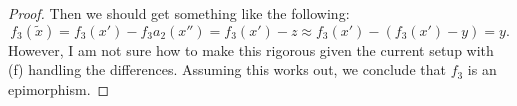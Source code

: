 \documentclass[12pt]{article}
\theoremstyle{definition}
\newcommand{\<}{\langle}
\renewcommand{\>}{\rangle}
\renewcommand{\tilde}{\widetilde}
\begin{document}
\begin{proof}
    Then we should get something like the following:
    \[
        f_3(\tilde{x})
            = f_3(x') - f_3a_2(x'')
            = f_3(x') - z
            \approx f_3(x') - (f_3(x') - y)
            = y.
    \]
    However, I am not sure how to make this rigorous given the current setup with (f) handling the differences.
    Assuming this works out, we conclude that $f_3$ is an epimorphism.
\end{proof}
\end{document}
